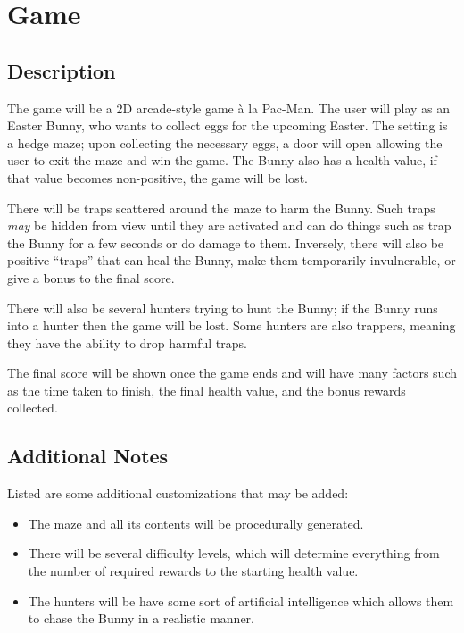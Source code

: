 \documentclass{article}
\begin{document}
\section{Game}

\subsection{Description}

The game will be a 2D arcade-style game à la Pac-Man.
The user will play as an Easter Bunny, who wants to collect eggs for the
upcoming Easter.
The setting is a hedge maze; upon collecting the necessary eggs, a door will
open allowing the user to exit the maze and win the game.
The Bunny also has a health value, if that value becomes non-positive, the
game will be lost.

There will be traps scattered around the maze to harm the Bunny.
Such traps \textit{may} be hidden from view until they are activated and can do
things such as trap the Bunny for a few seconds or do damage to them.
Inversely, there will also be positive ``traps'' that can heal the Bunny, make
them temporarily invulnerable, or give a bonus to the final score.

There will also be several hunters trying to hunt the Bunny; if the Bunny runs
into a hunter then the game will be lost.
Some hunters are also trappers, meaning they have the ability to drop harmful
traps.

The final score will be shown once the game ends and will have many factors such
as the time taken to finish, the final health value, and the bonus rewards
collected.

\subsection{Additional Notes}

Listed are some additional customizations that may be added:

\begin{itemize}
\item The maze and all its contents will be procedurally generated.
\item
    There will be several difficulty levels, which will determine everything
    from the number of required rewards to the starting health value.
\item
    The hunters will be have some sort of artificial intelligence which allows
    them to chase the Bunny in a realistic manner.
\end{itemize}
\end{document}
